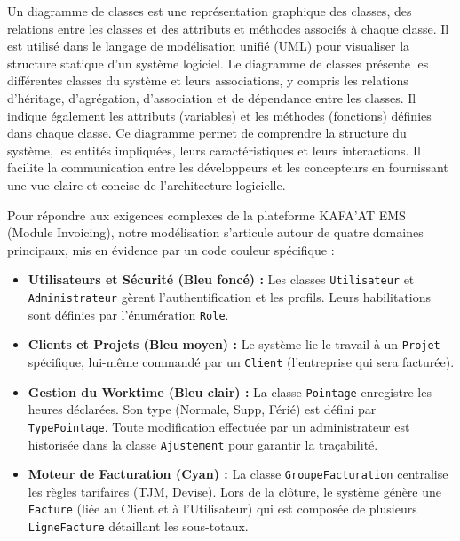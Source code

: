 \documentclass[12pt, a4paper, openany]{report}
\begin{document}
\vspace{-0.4cm}
Un diagramme de classes est une représentation graphique des classes, des relations entre les classes et des attributs et méthodes associés à chaque classe. Il est utilisé dans le langage de modélisation unifié (UML) pour visualiser la structure statique d'un système logiciel. Le diagramme de classes présente les différentes classes du système et leurs associations, y compris les relations d'héritage, d'agrégation, d'association et de dépendance entre les classes. Il indique également les attributs (variables) et les méthodes (fonctions) définies dans chaque classe. Ce diagramme permet de comprendre la structure du système, les entités impliquées, leurs caractéristiques et leurs interactions. Il facilite la communication entre les développeurs et les concepteurs en fournissant une vue claire et concise de l'architecture logicielle. \cite{uml_ibm}

Pour répondre aux exigences complexes de la plateforme KAFA'AT EMS (Module Invoicing), notre modélisation s'articule autour de quatre domaines principaux, mis en évidence par un code couleur spécifique :

\begin{itemize}[label=\textcolor{royalBlue}{\rule{1.2ex}{1.2ex}}, leftmargin=*, itemsep=0.2cm]
    \item \textcolor{primaryBlue}{\textbf{Utilisateurs et Sécurité (Bleu foncé) :}} Les classes \texttt{Utilisateur} et \texttt{Administrateur} gèrent l'authentification et les profils. Leurs habilitations sont définies par l'énumération \texttt{Role}.
    \item \textcolor{primaryBlue}{\textbf{Clients et Projets (Bleu moyen) :}} Le système lie le travail à un \texttt{Projet} spécifique, lui-même commandé par un \texttt{Client} (l'entreprise qui sera facturée).
    \item \textcolor{primaryBlue}{\textbf{Gestion du Worktime (Bleu clair) :}} La classe \texttt{Pointage} enregistre les heures déclarées. Son type (Normale, Supp, Férié) est défini par \texttt{TypePointage}. Toute modification effectuée par un administrateur est historisée dans la classe \texttt{Ajustement} pour garantir la traçabilité.
    \item \textcolor{primaryBlue}{\textbf{Moteur de Facturation (Cyan) :}} La classe \texttt{GroupeFacturation} centralise les règles tarifaires (TJM, Devise). Lors de la clôture, le système génère une \texttt{Facture} (liée au Client et à l'Utilisateur) qui est composée de plusieurs \texttt{LigneFacture} détaillant les sous-totaux.
\end{itemize}
\end{document}
